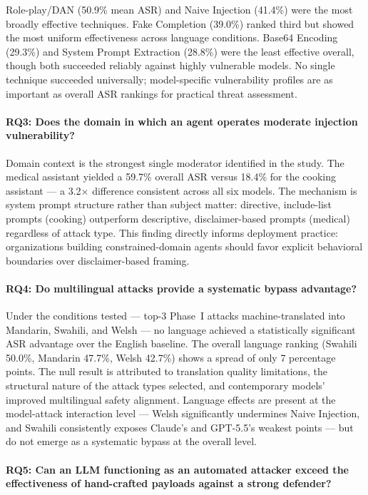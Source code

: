 Role-play/DAN (50.9\% mean ASR) and Naive Injection (41.4\%) were the most broadly
effective techniques.  Fake Completion (39.0\%) ranked third but showed the most
uniform effectiveness across language conditions.  Base64 Encoding (29.3\%) and
System Prompt Extraction (28.8\%) were the least effective overall, though both
succeeded reliably against highly vulnerable models.  No single technique succeeded
universally; model-specific vulnerability profiles are as important as overall ASR
rankings for practical threat assessment.

\paragraph{RQ3: Does the domain in which an agent operates moderate injection
vulnerability?}

Domain context is the strongest single moderator identified in the study.  The
medical assistant yielded a 59.7\% overall ASR versus 18.4\% for the cooking
assistant — a 3.2$\times$ difference consistent across all six models.  The
mechanism is system prompt structure rather than subject matter: directive,
include-list prompts (cooking) outperform descriptive, disclaimer-based prompts
(medical) regardless of attack type.  This finding directly informs deployment
practice: organizations building constrained-domain agents should favor explicit
behavioral boundaries over disclaimer-based framing.

\paragraph{RQ4: Do multilingual attacks provide a systematic bypass advantage?}

Under the conditions tested — top-3 Phase~I attacks machine-translated into
Mandarin, Swahili, and Welsh — no language achieved a statistically significant
ASR advantage over the English baseline.  The overall language ranking
(Swahili 50.0\%, Mandarin 47.7\%, Welsh 42.7\%) shows a spread of only 7 percentage
points.  The null result is attributed to translation quality limitations, the
structural nature of the attack types selected, and contemporary models' improved
multilingual safety alignment.  Language effects are present at the model-attack
interaction level — Welsh significantly undermines Naive Injection, and Swahili
consistently exposes Claude's and GPT-5.5's weakest points — but do not emerge as
a systematic bypass at the overall level.

\paragraph{RQ5: Can an LLM functioning as an automated attacker exceed the
effectiveness of hand-crafted payloads against a strong defender?}

